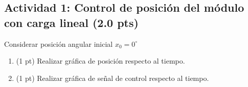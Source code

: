 \subsection{Actividad 1: Control de posición del módulo con carga lineal (2.0 pts)}
Considerar posición angular inicial $x_0 = 0^{\circ}$ 
\begin{enumerate}
	\item (1 pt) Realizar gráfica de posición respecto al tiempo.
	
	\item (1 pt) Realizar gráfica de señal de control respecto al tiempo.
\end{enumerate}